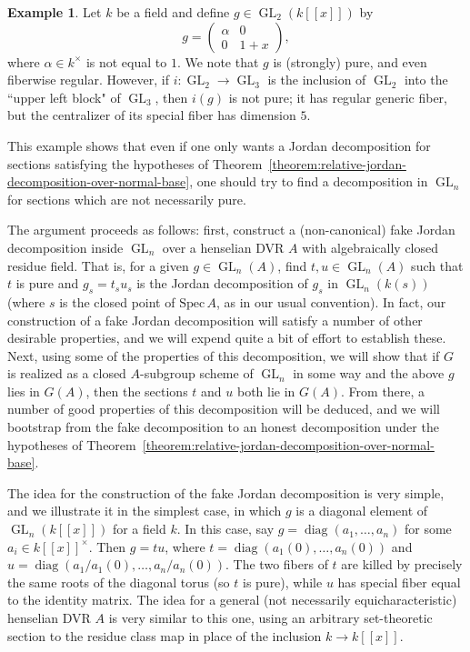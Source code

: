 \documentclass[11pt,reqno]{amsart}
\theoremstyle{definition}
\newtheorem{example}[theorem]{Example}
\newcommand{\Spec}{\mathrm{Spec} \,}
\DeclareMathOperator{\diag}{diag}
\DeclareMathOperator{\GL}{GL}
\begin{document}
\begin{example}
Let $k$ be a field and define $g \in \GL_2(k[\![x]\!])$ by
\[
g = \begin{pmatrix} \alpha & 0 \\ 0 & 1 + x \end{pmatrix},
\]
where $\alpha \in k^\times$ is not equal to $1$. We note that $g$ is (strongly) pure, and even fiberwise regular. However, if $i: \GL_2 \to \GL_3$ is the inclusion of $\GL_2$ into the ``upper left block" of $\GL_3$, then $i(g)$ is not pure; it has regular generic fiber, but the centralizer of its special fiber has dimension $5$.
\end{example}

This example shows that even if one only wants a Jordan decomposition for sections satisfying the hypotheses of Theorem~\ref{theorem:relative-jordan-decomposition-over-normal-base}, one should try to find a decomposition in $\GL_n$ for sections which are not necessarily pure.\smallskip

The argument proceeds as follows: first, construct a (non-canonical) fake Jordan decomposition inside $\GL_n$ over a henselian DVR $A$ with algebraically closed residue field. That is, for a given $g \in \GL_n(A)$, find $t, u \in \GL_n(A)$ such that $t$ is pure and $g_s = t_s u_s$ is the Jordan decomposition of $g_s$ in $\GL_n(k(s))$ (where $s$ is the closed point of $\Spec A$, as in our usual convention). In fact, our construction of a fake Jordan decomposition will satisfy a number of other desirable properties, and we will expend quite a bit of effort to establish these. Next, using some of the properties of this decomposition, we will show that if $G$ is realized as a closed $A$-subgroup scheme of $\GL_n$ in some way and the above $g$ lies in $G(A)$, then the sections $t$ and $u$ both lie in $G(A)$. From there, a number of good properties of this decomposition will be deduced, and we will bootstrap from the fake decomposition to an honest decomposition under the hypotheses of Theorem~\ref{theorem:relative-jordan-decomposition-over-normal-base}. \smallskip

The idea for the construction of the fake Jordan decomposition is very simple, and we illustrate it in the simplest case, in which $g$ is a diagonal element of $\GL_n(k[\![x]\!])$ for a field $k$. In this case, say $g = \diag(a_1, \dots, a_n)$ for some $a_i \in k[\![x]\!]^\times$. Then $g = tu$, where $t = \diag(a_1(0), \dots, a_n(0))$ and $u = \diag(a_1/a_1(0), \dots, a_n/a_n(0))$. The two fibers of $t$ are killed by precisely the same roots of the diagonal torus (so $t$ is pure), while $u$ has special fiber equal to the identity matrix. The idea for a general (not necessarily equicharacteristic) henselian DVR $A$ is very similar to this one, using an arbitrary set-theoretic section to the residue class map in place of the inclusion $k \to k[\![x]\!]$.
\end{document}
